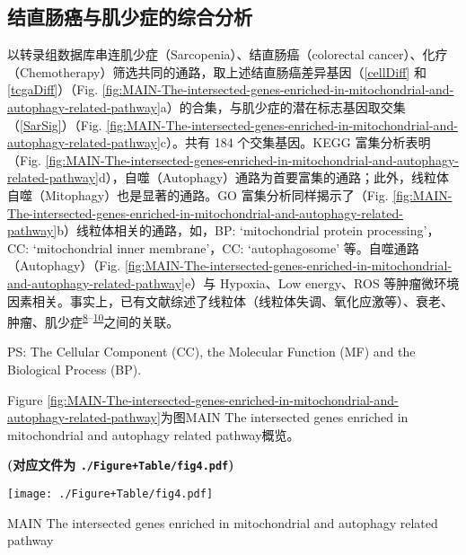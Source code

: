 \documentclass[
]{article}
\begin{document}
\hypertarget{ux7ed3ux76f4ux80a0ux764cux4e0eux808cux5c11ux75c7ux7684ux7efcux5408ux5206ux6790}{%
\subsection{结直肠癌与肌少症的综合分析}\label{ux7ed3ux76f4ux80a0ux764cux4e0eux808cux5c11ux75c7ux7684ux7efcux5408ux5206ux6790}}

以转录组数据库串连肌少症（Sarcopenia）、结直肠癌（colorectal cancer）、化疗（Chemotherapy）筛选共同的通路，取上述结直肠癌差异基因（\ref{cellDiff} 和 \ref{tcgaDiff}）（Fig. \ref{fig:MAIN-The-intersected-genes-enriched-in-mitochondrial-and-autophagy-related-pathway}a）的合集，与肌少症的潜在标志基因取交集（\ref{SarSig}）（Fig. \ref{fig:MAIN-The-intersected-genes-enriched-in-mitochondrial-and-autophagy-related-pathway}c）。共有 184 个交集基因。KEGG 富集分析表明（Fig. \ref{fig:MAIN-The-intersected-genes-enriched-in-mitochondrial-and-autophagy-related-pathway}d），自噬（Autophagy）通路为首要富集的通路；此外，线粒体自噬（Mitophagy）也是显著的通路。GO 富集分析同样揭示了（Fig. \ref{fig:MAIN-The-intersected-genes-enriched-in-mitochondrial-and-autophagy-related-pathway}b）线粒体相关的通路，如，BP: `mitochondrial protein processing'，CC: `mitochondrial inner membrane'，CC: `autophagosome' 等。自噬通路（Autophagy）（Fig. \ref{fig:MAIN-The-intersected-genes-enriched-in-mitochondrial-and-autophagy-related-pathway}e）与 Hypoxia、Low energy、ROS 等肿瘤微环境因素相关。事实上，已有文献综述了线粒体（线粒体失调、氧化应激等）、衰老、肿瘤、肌少症\textsuperscript{\protect\hyperlink{ref-MitochondrialDKudrya2016}{8}--\protect\hyperlink{ref-TheRoleOfAgiHavas2022}{10}}之间的关联。

PS: The Cellular Component (CC), the Molecular Function (MF) and the Biological Process (BP).

Figure \ref{fig:MAIN-The-intersected-genes-enriched-in-mitochondrial-and-autophagy-related-pathway}为图MAIN The intersected genes enriched in mitochondrial and autophagy related pathway概览。

\textbf{(对应文件为 \texttt{./Figure+Table/fig4.pdf})}

\def\@captype{figure}
\begin{center}
\texttt{[image: ./Figure+Table/fig4.pdf]}
\caption{MAIN The intersected genes enriched in mitochondrial and autophagy related pathway}\label{fig:MAIN-The-intersected-genes-enriched-in-mitochondrial-and-autophagy-related-pathway}
\end{center}
\end{document}
